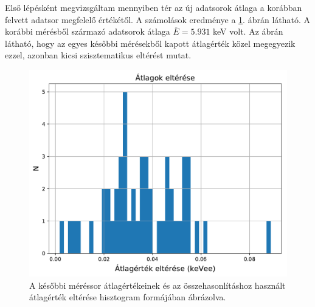 \documentclass[12pt,a4paper]{article}
\begin{document}
\hspace*{10pt} Első lépésként megvizsgáltam mennyiben tér az új adatsorok átlaga a korábban felvett adatsor megfelelő értékétől. A számolások eredménye a \ref{fig:1a}. ábrán látható. A korábbi mérésből származó adatsorok átlaga $\overline{E}=5.931$ keV volt. Az ábrán látható, hogy az egyes későbbi mérésekből kapott átlagérték közel megegyezik ezzel, azonban kicsi szisztematikus eltérést mutat.\\
\begin{figure}[!h]
\centering
\includegraphics[width=0.8\linewidth]{atlag}
\caption{A későbbi méréssor átlagértékeinek és az összehasonlításhoz használt átlagérték eltérése hisztogram formájában ábrázolva.}
\label{fig:1a}
\end{figure}
\end{document}
